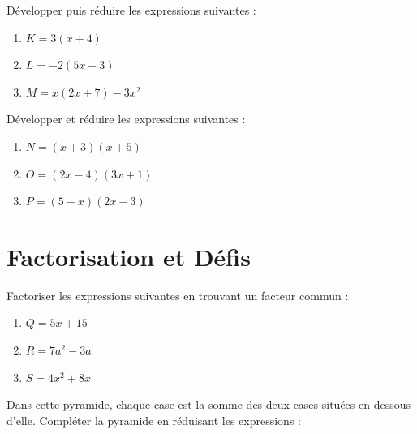 \documentclass[a4paper]{book}
\begin{document}
    \begin{exercice}
    Développer puis réduire les expressions suivantes :
    \begin{enumerate}
        \item $K = 3(x + 4)$
        \item $L = -2(5x - 3)$
        \item $M = x(2x + 7) - 3x^2$
    \end{enumerate}
    \end{exercice}
    
    \begin{exercice}
    Développer et réduire les expressions suivantes :
    \begin{enumerate}
        \item $N = (x + 3)(x + 5)$
        \item $O = (2x - 4)(3x + 1)$
        \item $P = (5 - x)(2x - 3)$
    \end{enumerate}
    \end{exercice}


\section{Factorisation et Défis}

    
    \begin{exercice}[Factoriser]
    Factoriser les expressions suivantes en trouvant un facteur commun :
    \begin{enumerate}
        \item $Q = 5x + 15$
        \item $R = 7a^2 - 3a$
        \item $S = 4x^2 + 8x$
    \end{enumerate}
    \end{exercice}


\newpage %
     
    \begin{exercice}
    Dans cette pyramide, chaque case est la somme des deux cases situées en dessous d'elle. Compléter la pyramide en réduisant les expressions :
    \begin{center}
    \end{center}
    \end{exercice}
    
\end{document}
